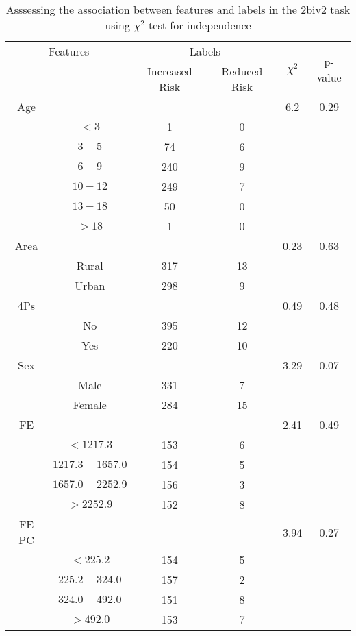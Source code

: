 \begin{table}[!htb]
\centering
\caption{Asssessing the association between features and labels in the 2biv2 task using $\chi^2$ test for independence}
\label{tab:chitest_2biv2}
\begin{tabular}{c c | c c| c | c}
\hline
\multicolumn{2}{c|}{Features}& \multicolumn{2}{c|}{Labels}& \multirow{2}{*}{$\chi^2$} & \multirow{2}{*}{p-value}\\ 
& & Increased Risk & Reduced Risk & & \\ 
\hline
Age &  &  & & 6.2 & 0.29 \\ 
& $< 3$ & 1 & 0& & \\ 
& $3-5$ & 74 & 6& & \\ 
& $6-9$ & 240 & 9& & \\ 
& $10-12$ & 249 & 7& & \\ 
& $13-18$ & 50 & 0& & \\ 
& $> 18$ & 1 & 0& & \\ 
\hline 
Area &  &  & & 0.23 & 0.63 \\ 
& Rural & 317 & 13& & \\ 
& Urban & 298 & 9& & \\ 
\hline 
4Ps &  &  & & 0.49 & 0.48 \\ 
& No & 395 & 12& & \\ 
& Yes & 220 & 10& & \\ 
\hline 
Sex &  &  & & 3.29 & 0.07 \\ 
& Male & 331 & 7& & \\ 
& Female & 284 & 15& & \\ 
\hline 
FE &  &  & & 2.41 & 0.49 \\ 
& $< 1217.3$ & 153 & 6& & \\ 
& $1217.3-1657.0$ & 154 & 5& & \\ 
& $1657.0-2252.9$ & 156 & 3& & \\ 
& $> 2252.9$ & 152 & 8& & \\ 
\hline 
FE PC &  &  & & 3.94 & 0.27 \\ 
& $< 225.2$ & 154 & 5& & \\ 
& $225.2-324.0$ & 157 & 2& & \\ 
& $324.0-492.0$ & 151 & 8& & \\ 
& $> 492.0$ & 153 & 7& & \\ 
\hline 
\end{tabular}
\end{table}
